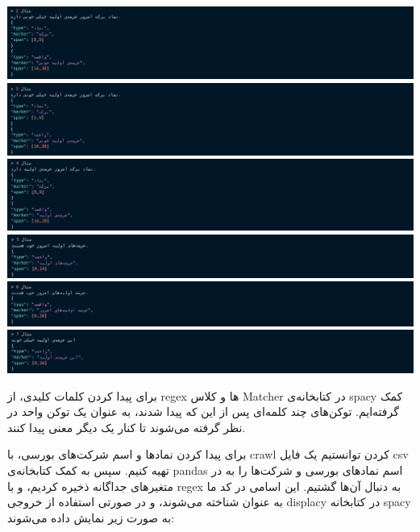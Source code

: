 \documentclass[a4paper,12pt]{article}
\begin{document}
\begin{center}
	\includegraphics[scale=0.5, trim ={0 0 17cm 0}, clip]{images/IPO1.png}
	\includegraphics[scale=0.5, trim ={0 0 17cm 0}, clip]{images/IPO2.png}
	\includegraphics[scale=0.5, trim ={0 0 17cm 0}, clip]{images/IPO3.png}
	\includegraphics[scale=0.5, trim ={0 0 17cm 0}, clip]{images/IPO4.png}
	\includegraphics[scale=0.5, trim ={0 0 17cm 0}, clip]{images/IPO5.png}
	\includegraphics[scale=0.5, trim ={0 0 17cm 0}, clip]{images/IPO6.png}
\end{center}



برای پیدا کردن کلمات کلیدی، از 
regex
ها و کلاس 
Matcher
در کتابخانه‌ی 
spacy
کمک گرفته‌ایم. توکن‌های چند کلمه‌ای پس از این که پیدا شدند، به عنوان یک توکن واحد در نظر 
گرفته می‌شوند تا کنار یک دیگر معنی پیدا کنند. 

برای پیدا کردن نماد‌ها و اسم شرکت‌های بورسی، با 
crawl
کردن توانستیم یک فایل 
csv
تهیه کنیم. سپس به کمک کتابخانه‌ی 
pandas
اسم نماد‌های بورسی و شرکت‌ها را به در متغیر‌های جداگانه ذخیره کردیم، و با 
regex
به دنبال آن‌ها گشتیم. این اسامی در کد ما به عنوان
شناخته می‌شوند، و در صورتی استفاده از خروجی
displacy
در کتابخانه
spacy
به صورت زیر نمایش داده می‌شوند: 
\end{document}
